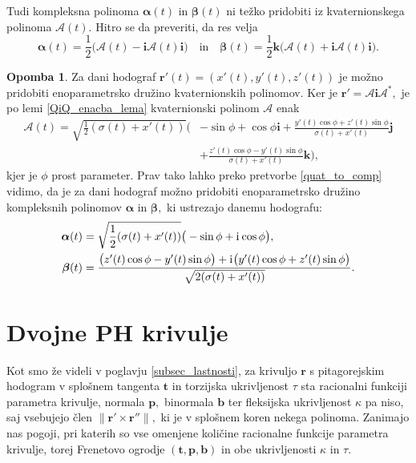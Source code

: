 \documentclass[12pt,a4paper,twoside]{article}
\newcommand{\iu}{\mathrm{i}\mkern1mu} %
\theoremstyle{definition} %
\newtheorem{opomba}[definicija]{Opomba}
\theoremstyle{plain} %
\theoremstyle{primerstyle}
\numberwithin{equation}{section}  %
\newcommand{\tV}{\mathbf{t}}
\newcommand{\bV}{\mathbf{b}}
\newcommand{\pV}{\mathbf{p}}
\newcommand{\rV}{\mathbf{r}}
\newcommand{\iV}{\mathbf{i}}
\newcommand{\jV}{\mathbf{j}}
\newcommand{\kV}{\mathbf{k}}
\newcommand{\AQ}{\mathcal{A}}
\newcommand{\balpha}{\boldsymbol \alpha}
\newcommand{\bbeta}{\boldsymbol \beta}
\begin{document}
Tudi kompleksna polinoma $\balpha(t)$ in $\bbeta(t)$ ni težko pridobiti iz kvaternionskega polinoma $\AQ(t).$ Hitro se da preveriti, da res velja
\begin{equation}
	\label{quat_to_comp}
		\balpha(t) = \frac{1}{2}\big(\AQ(t)-\iV\AQ(t)\iV\big) \quad \text{in} \quad \bbeta(t)= \frac{1}{2}\kV\big(\AQ(t)+\iV\AQ(t)\iV\big).
\end{equation}

\begin{opomba}
	Za dani hodograf $\rV'(t)=(x'(t),y'(t),z'(t))$ je možno pridobiti enoparametrsko družino kvaternionskih polinomov. Ker je $\rV'=\AQ\iV\AQ^*,$ je po lemi \ref{QiQ_enacba_lema} kvaternionski polinom $\AQ$ enak
	\begin{align*}
		\AQ(t)=\sqrt{\frac{1}{2}(\sigma(t)+x'(t))}\Big(&-\sin\phi+\cos\phi\iV+\frac{y'(t)\cos\phi+z'(t)\sin\phi}{\sigma(t)+x'(t)}\jV\\
		&+\frac{z'(t)\cos\phi-y'(t)\sin\phi}{\sigma(t)+x'(t)}\kV\Big),
	\end{align*}
	kjer je $\phi$ prost parameter. Prav tako lahko preko pretvorbe \eqref{quat_to_comp} vidimo, da je za dani hodograf možno pridobiti enoparametrsko družino kompleksnih polinomov $\balpha$ in $\bbeta,$ ki ustrezajo danemu hodografu:
	\begin{align*}
		\balpha(t)&=\sqrt{\frac{1}{2}(\sigma(t)+x'(t))}\big(-\sin\phi+\iu\cos\phi\big),\\
		\bbeta(t)&=\frac{\big(z'(t)\cos\phi-y'(t)\sin\phi\big)+\iu\big(y'(t)\cos\phi+z'(t)\sin\phi\big)}{\sqrt{2(\sigma(t)+x'(t))}}.
	\end{align*}
\end{opomba}

\section{Dvojne PH krivulje}

Kot smo že videli v poglavju \ref{subsec_lastnosti}, za krivuljo $\rV$ s pitagorejskim hodogram v splošnem tangenta $\tV$ in torzijska ukrivljenost $\tau$ sta racionalni funkciji parametra krivulje, normala $\pV,$ binormala $\bV$ ter fleksijska ukrivljenost $\kappa$ pa niso, saj vsebujejo člen $\lVert \rV' \times \rV'' \rVert,$ ki je v splošnem koren nekega polinoma. Zanimajo nas pogoji, pri katerih so vse omenjene količine racionalne funkcije parametra krivulje, torej Frenetovo ogrodje $(\tV,\pV,\bV)$ in obe ukrivljenosti $\kappa$ in $\tau.$
\end{document}
